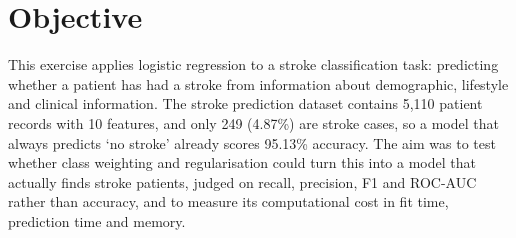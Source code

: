\section{Objective}
This exercise applies logistic regression to a stroke classification task: predicting whether a patient has had a stroke from information about demographic, lifestyle and clinical information.
The stroke prediction dataset contains 5,110 patient records with 10 features, and only 249 (4.87\%) are stroke cases, so a model that always predicts `no stroke' already scores 95.13\% accuracy.
The aim was to test whether class weighting and regularisation could turn this into a model that actually finds stroke patients, judged on recall, precision, F1 and ROC-AUC rather than accuracy, and to measure its computational cost in fit time, prediction time and memory.
